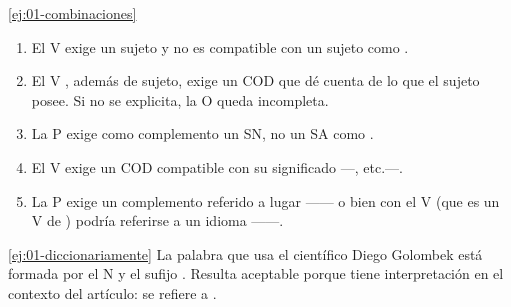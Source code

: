 \begin{solucion}{\ref{ej:01-combinaciones}}
\begin{enumerate}[label=\arabic*., start=2, leftmargin=2em, itemsep=.2\baselineskip]
  \item El V  exige un sujeto  y no es compatible con
        un sujeto como .
  \item El V , además de sujeto, exige un COD que dé cuenta de lo
        que el sujeto posee. Si no se explicita, la O queda incompleta.
  \item La P exige como complemento un SN, no un SA como .
  \item El V  exige un COD compatible con su significado
        ---, etc.---.
  \item La P  exige un complemento referido a lugar ------ o bien con el V  (que es un V de
        ) podría referirse a un idioma ------.
\end{enumerate}
\end{solucion}

\begin{solucion}{\ref{ej:01-diccionariamente}}
La palabra  que usa el científico Diego Golombek está
formada por el N  y el sufijo . Resulta
aceptable porque tiene interpretación en el contexto del artículo: se refiere a
.
\end{solucion}

